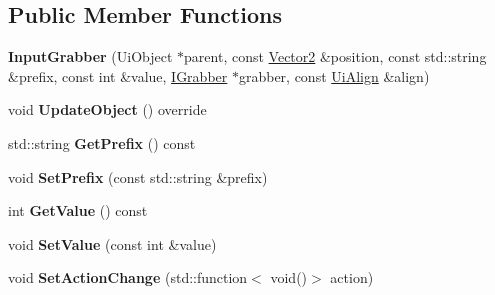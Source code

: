 \subsection*{Public Member Functions}
\begin{DoxyCompactItemize}
\item 
\mbox{\label{class_flounder_1_1_input_grabber_ac9cf10c907dcaf603ec7a8d2e989ee7a}} 
{\bfseries Input\+Grabber} (Ui\+Object $\ast$parent, const \hyperlink{class_flounder_1_1_vector2}{Vector2} \&position, const std\+::string \&prefix, const int \&value, \hyperlink{class_flounder_1_1_i_grabber}{I\+Grabber} $\ast$grabber, const \hyperlink{namespace_flounder_a561db2012ae4152be62bcd882407d361}{Ui\+Align} \&align)
\item 
\mbox{\label{class_flounder_1_1_input_grabber_ae00771d83b297c4cfd65f99e9d8c3235}} 
void {\bfseries Update\+Object} () override
\item 
\mbox{\label{class_flounder_1_1_input_grabber_aa0cf83e7db7f3516b8b4b2f2fbf32917}} 
std\+::string {\bfseries Get\+Prefix} () const
\item 
\mbox{\label{class_flounder_1_1_input_grabber_ad186a6eeaa9de1e641809c3824bbd9de}} 
void {\bfseries Set\+Prefix} (const std\+::string \&prefix)
\item 
\mbox{\label{class_flounder_1_1_input_grabber_a6f8356a5475cc5f0b65aa38e0f9319ac}} 
int {\bfseries Get\+Value} () const
\item 
\mbox{\label{class_flounder_1_1_input_grabber_ac069cf08500f0ec42b158437a9016c4b}} 
void {\bfseries Set\+Value} (const int \&value)
\item 
\mbox{\label{class_flounder_1_1_input_grabber_ac410495951544ff384f096058f689f7d}} 
void {\bfseries Set\+Action\+Change} (std\+::function$<$ void()$>$ action)
\end{DoxyCompactItemize}
